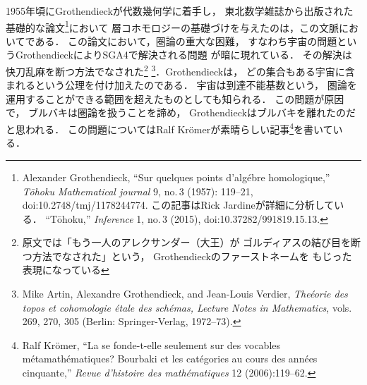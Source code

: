 \documentclass[9pt, a4paper, dvipdfmx]{jlreq}
\theoremstyle{definition}
\theoremstyle{mystyle}
\numberwithin{equation}{section} %
\begin{document}
1955年頃にGrothendieckが代数幾何学に着手し，
東北数学雑誌から出版された基礎的な論文\footnote[6]{
    Alexander Grothendieck, 
    ``Sur quelques points d'alg\'ebre homologique,'' 
    \textit{T\=ohoku Mathematical journal} 9, no.\,3 (1957): 
    119--21, doi:10.2748/tmj/1178244774. 
    この記事はRick Jardineが詳細に分析している．
    ``T\=ohoku,'' \textit{Inference} 1, no.\,3 (2015), 
    doi:10.37282/991819.15.13.
}において
層コホモロジーの基礎づけを与えたのは，この文脈においてである．
この論文において，圏論の重大な困難，
すなわち宇宙の問題というGrothendieckによりSGA4で解決される問題
が暗に現れている．
\renewcommand{\thefootnote}{[訳注]}
その解決は快刀乱麻を断つ方法でなされた\footnote{
    原文では「もう一人のアレクサンダー（大王）が
    ゴルディアスの結び目を断つ方法でなされた」という，
    Grothendieckのファーストネームを
    もじった表現になっている
}
\renewcommand{\thefootnote}{\arabic{footnote})}
\footnote[7]{
    Mike Artin, Alexandre Grothendieck, and Jean-Louis Verdier, 
    \textit{The\'eorie des topos et 
    cohomologie \'etale des sch\'emas, 
    Lecture Notes in Mathematics}, 
    vols.\,269, 270, 305 (Berlin: Springer-Verlag, 1972--73).
}．Grothendieckは，
どの集合もある宇宙に含まれるという公理を付け加えたのである．
宇宙は到達不能基数という，
圏論を運用することができる範囲を超えたものとしても知られる．
この問題が原因で，
ブルバキは圏論を扱うことを諦め，
Grothendieckはブルバキを離れたのだと思われる．
この問題についてはRalf Kr\"omerが素晴らしい記事\footnote[8]{
    Ralf Kr\"omer, 
    ``La {\fg} 
    se fonde-t-elle seulement sur des vocables 
    m\'etamath\'ematiques? 
    Bourbaki et les cat\'egories au 
    cours des ann\'ees cinquante,'' 
    \textit{Revue d'histoire des math\'ematiques} 12 (2006):119--62.
}を書いている．

\end{document}
